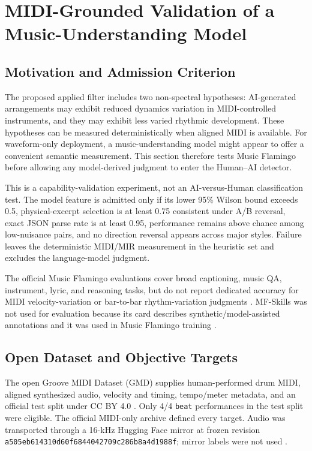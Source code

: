 \section{MIDI-Grounded Validation of a Music-Understanding Model}
\label{sec:music-flamingo-probe}

\subsection{Motivation and Admission Criterion}

The proposed applied filter includes two non-spectral hypotheses: AI-generated
arrangements may exhibit reduced dynamics variation in MIDI-controlled
instruments, and they may exhibit less varied rhythmic development. These
hypotheses can be measured deterministically when aligned MIDI is available.
For waveform-only deployment, a music-understanding model might appear to offer
a convenient semantic measurement. This section therefore tests Music Flamingo
\citep{musicflamingo2025} before allowing any model-derived judgment to enter
the Human--AI detector.

This is a capability-validation experiment, not an AI-versus-Human
classification test. The model feature is admitted only if its lower 95\%
Wilson bound exceeds 0.5, physical-excerpt selection is at least 0.75 consistent
under A/B reversal, exact JSON parse rate is at least 0.95, performance remains
above chance among low-nuisance pairs, and no direction reversal appears across
major styles. Failure leaves the deterministic MIDI/MIR measurement in the
heuristic set and excludes the language-model judgment.

The official Music Flamingo evaluations cover broad captioning, music QA,
instrument, lyric, and reasoning tasks, but do not report dedicated accuracy
for MIDI velocity-variation or bar-to-bar rhythm-variation judgments
\citep{musicflamingohf2026}. MF-Skills was not used for evaluation because its
card describes synthetic/model-assisted annotations and it was used in Music
Flamingo training \citep{mfskills2025}.

\subsection{Open Dataset and Objective Targets}

The open Groove MIDI Dataset (GMD) supplies human-performed drum MIDI, aligned
synthesized audio, velocity and timing, tempo/meter metadata, and an official
test split under CC BY 4.0 \citep{gmd2019}. Only 4/4 \texttt{beat}
performances in the test split were eligible. The official MIDI-only archive
defined every target. Audio was transported through a 16-kHz Hugging Face
mirror at frozen revision
\texttt{a505eb614310d60f6844042709c286b8a4d1988f}; mirror labels were not used
\citep{gmdmirror2026}.

